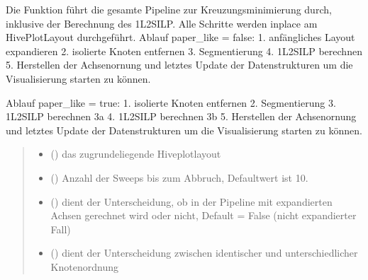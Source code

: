 \documentclass[a4paper,10pt,ngerman]{sphinxmanual}
\begin{document}
\begin{fulllineitems}
\label{\detokenize{api:src.ip_model.ip_model_pipeline}}
\pysigstartsignatures
\pysiglinewithargsret
{}
{\sphinxparamcomma {}\sphinxparamcomma {}\sphinxparamcomma {}}
{}
\pysigstopsignatures
\sphinxAtStartPar
Die Funktion führt die gesamte Pipeline zur Kreuzungsminimierung durch, inklusive der Berechnung des 1L2S\sphinxhyphen{}ILP. Alle Schritte werden in\sphinxhyphen{}place am HivePlotLayout durchgeführt.
Ablauf paper\_like = false:
1. anfängliches Layout expandieren
2. isolierte Knoten entfernen
3. Segmentierung
4. 1L2S\sphinxhyphen{}ILP berechnen
5. Herstellen der Achsenornung und letztes Update der Datenstrukturen um die Visualisierung starten zu können.

\sphinxAtStartPar
Ablauf paper\_like = true:
1. isolierte Knoten entfernen
2. Segmentierung
3. 1L2S\sphinxhyphen{}ILP berechnen 3a
4. 1L2S\sphinxhyphen{}ILP berechnen 3b
5. Herstellen der Achsenornung und letztes Update der Datenstrukturen um die Visualisierung starten zu können.
\begin{quote}\begin{description}
\begin{itemize}
\item {} 
\sphinxAtStartPar
{} () \textendash{} das zugrundeliegende Hiveplotlayout

\item {} 
\sphinxAtStartPar
{} () \textendash{} Anzahl der Sweeps bis zum Abbruch, Defaultwert ist 10.

\item {} 
\sphinxAtStartPar
{} () \textendash{} dient der Unterscheidung, ob in der Pipeline mit expandierten Achsen gerechnet wird oder nicht, Default = False (nicht expandierter Fall)

\item {} 
\sphinxAtStartPar
{} () \textendash{} dient der Unterscheidung zwischen identischer und unterschiedlicher Knotenordnung

\end{itemize}

\sphinxAtStartPar
{}

\end{description}\end{quote}

\end{fulllineitems}
\end{document}
